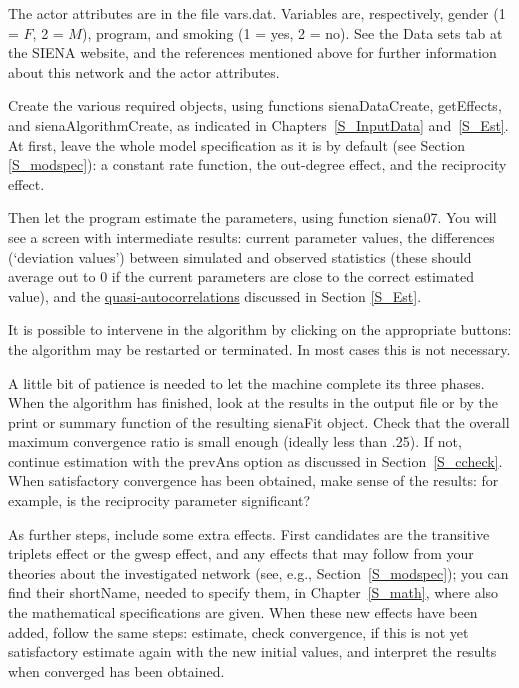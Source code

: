 \documentclass[a4paper,fleqn,11pt]{article}
\newcommand{\+}{\, + \,}
\newcommand{\sfn}[1]{\textsf{#1}}
\newcommand{\SI}{{\sf SIENA }}
\begin{document}
The actor attributes are in the file {\sf vars.dat}. Variables
are, respectively, gender (1 = $F$, 2 = $M$), program, and smoking
(1 = yes, 2 = no). See the \sfn{Data sets} tab at the
\SI website, and the references mentioned above for further
information about this network and the actor attributes.

Create the various required objects, using functions
\sfn{sienaDataCreate}, \sfn{getEffects}, and \sfn{sienaAlgorithmCreate},
as indicated in Chapters~\ref{S_InputData} and~\ref{S_Est}.
At first, leave the whole model specification as
it is by default (see Section \ref{S_modspec}):
a constant rate function, the out-degree effect, and
the reciprocity effect.

Then let the program estimate the parameters, using function \sfn{siena07}.
You will see a
screen with intermediate results: current parameter values, the
differences (`deviation values') between simulated and observed
statistics (these should average out to 0 if the current
parameters are close to the correct estimated value), and the
\hyperlink{T_quasiac}{quasi-autocorrelations} discussed in Section
\ref{S_Est}.

It is possible to intervene in the algorithm by clicking on the
appropriate buttons:
the algorithm may be restarted or terminated. In most cases
this is not necessary.

A little bit of patience is needed to let the machine complete its three
phases.
When the algorithm has finished, look at the results in the output file
or by the \sfn{print} or \sfn{summary} function of the
resulting \sfn{sienaFit} object. Check
that the overall maximum convergence ratio is small enough
(ideally less than .25).
If not, continue estimation with the \sfn{prevAns} option
as discussed in Section~\ref{S_ccheck}.
When satisfactory convergence has been obtained, make sense
of the results: for example, is the reciprocity parameter significant?

As further steps, include some extra effects. First candidates
are the transitive triplets effect or the gwesp effect, and any
effects that may follow from your theories about the investigated network
(see, e.g., Section~\ref{S_modspec});
you can find their \sfn{shortName},
needed to specify them, in Chapter~\ref{S_math},
where also the mathematical specifications are given.
When these new effects have been added, follow the same steps:
estimate, check convergence, if this is not yet satisfactory
estimate again with the new initial values, and interpret the
results when converged has been obtained.
\end{document}
